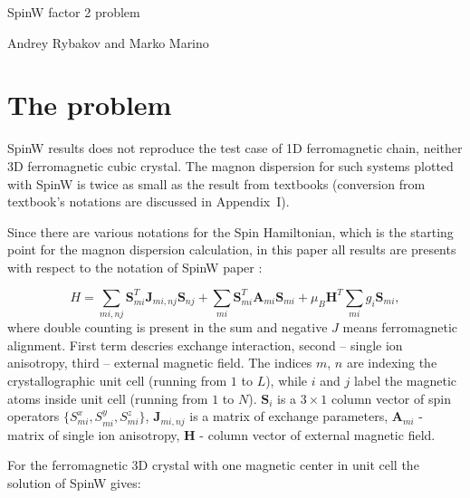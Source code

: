 \documentclass[a4paper,12pt]{article}
\begin{document}
    \begin{center}
    \centering \LARGE SpinW factor 2 problem

    \vspace{1cm}
    \small Andrey Rybakov and Marko Marino
    \end{center}

    \section{The problem}

        SpinW \cite{SpinW} results does not reproduce the test case of 1D ferromagnetic chain, neither 3D ferromagnetic cubic crystal. 
        The magnon dispersion for such systems plotted with SpinW is twice as small as the result from textbooks 
        \cite{rezende2020fundamentals, blundell2003magnetism, gurevich1996magnetization, simon2013oxford, coey2010magnetism, jensen1991rare} (conversion from textbook's notations are discussed in Appendix~I). 

        Since there are various notations for the Spin Hamiltonian, which is the starting point for the magnon dispersion calculation, 
        in this paper all results are presents with respect to the notation of SpinW paper \cite{toth2015linear}:

        \begin{equation}
            H = \sum_{mi,nj}\boldsymbol{S}^T_{mi}\boldsymbol{J}_{mi, nj}\boldsymbol{S}_{nj} + 
            \sum_{mi}\boldsymbol{S}^T_{mi}\boldsymbol{A}_{mi}\boldsymbol{S}_{mi} + 
            \mu_B\boldsymbol{H}^T\sum_{mi}g_i\boldsymbol{S}_{mi},
        \end{equation}
        where double counting is present in the sum and negative $J$ means ferromagnetic alignment. 
        First term descries exchange interaction, second -- single ion anisotropy, third -- external magnetic field.
        The indices $m$, $n$ are indexing the crystallographic unit cell (running from $1$ to $L$), while $i$ and $j$ label the magnetic atoms inside unit cell (running from $1$ to $N$).
        $\boldsymbol{S}_i$ is a $3 \times 1$ column vector of spin operators $\{S_{mi}^x, S_{mi}^y, S_{mi}^z\}$, 
        $\boldsymbol{J}_{mi, nj}$ is a matrix of exchange parameters, $\boldsymbol{A}_{mi}$ - matrix of single ion anisotropy,  
        $\boldsymbol{H}$ - column vector of external magnetic field. 

        For the ferromagnetic 3D crystal with one magnetic center in unit cell the solution of SpinW gives:
\end{document}
